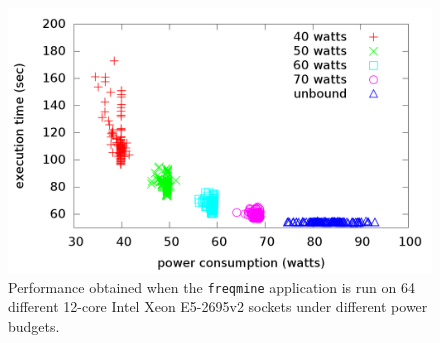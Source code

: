  \begin{figure}[ht]
				\centering
        \includegraphics[width=\columnwidth]{background/figures/freqmine_power2perf_per_socket}
        \caption{Performance obtained when the \texttt{freqmine} application is run on 64 different 12-core Intel Xeon E5-2695v2 sockets under different power budgets.}
        \label{fig:socket_perf_variation}%
\vspace{.5cm}
\end{figure}

  
